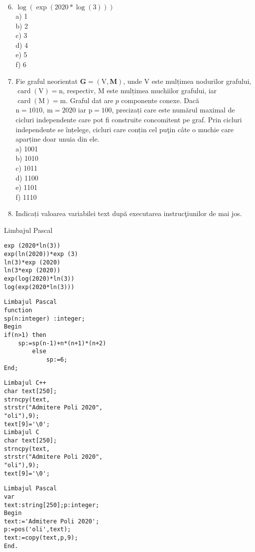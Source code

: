 \begin{enumerate}
  \setcounter{enumi}{5}
  \item $\log (\exp (2020 * \log (3)))$\\
a) 1\\
b) 2\\
c) 3\\
d) 4\\
e) 5\\
f) 6
  \item Fie graful neorientat $\mathbf{G}=(\mathrm{V}, \mathbf{M})$, unde V este mulțimea nodurilor grafului, $\operatorname{card}(\mathrm{V})=\mathrm{n}$, respectiv, M este mulțimea muchiilor grafului, iar $\operatorname{card}(\mathrm{M})=\mathrm{m}$. Graful dat are $p$ componente conexe. Dacă $\mathrm{n}=1010, \mathrm{~m}=2020$ iar $\mathrm{p}=100$, precizați care este numărul maximal de cicluri independente care pot fi construite concomitent pe graf. Prin cicluri independente se înțelege, cicluri care conțin cel puţin câte o muchie care aparține doar unuia din ele.\\
a) 1001\\
b) 1010\\
c) 1011\\
d) 1100\\
e) 1101\\
f) 1110
  \item Indicați valoarea variabilei text după executarea instrucţiunilor de mai jos.
\end{enumerate}

Limbajul Pascal

\begin{verbatim}
exp (2020*ln(3))
exp(ln(2020))*exp (3)
ln(3)*exp (2020)
ln(3*exp (2020))
exp(log(2020)*ln(3))
log(exp(2020*ln(3)))
\end{verbatim}

\begin{verbatim}
Limbajul Pascal
function
sp(n:integer) :integer;
Begin
if(n>1) then
    sp:=sp(n-1)+n*(n+1)*(n+2)
        else
            sp:=6;
End;
\end{verbatim}

\begin{verbatim}
Limbajul C++
char text[250];
strncpy(text,
strstr("Admitere Poli 2020",
"oli"),9);
text[9]='\0';
Limbajul C
char text[250];
strncpy(text,
strstr("Admitere Poli 2020",
"oli"),9);
text[9]='\0';
\end{verbatim}

\begin{verbatim}
Limbajul Pascal
var
text:string[250];p:integer;
Begin
text:='Admitere Poli 2020';
p:=pos('oli',text);
text:=copy(text,p,9);
End.
\end{verbatim}

